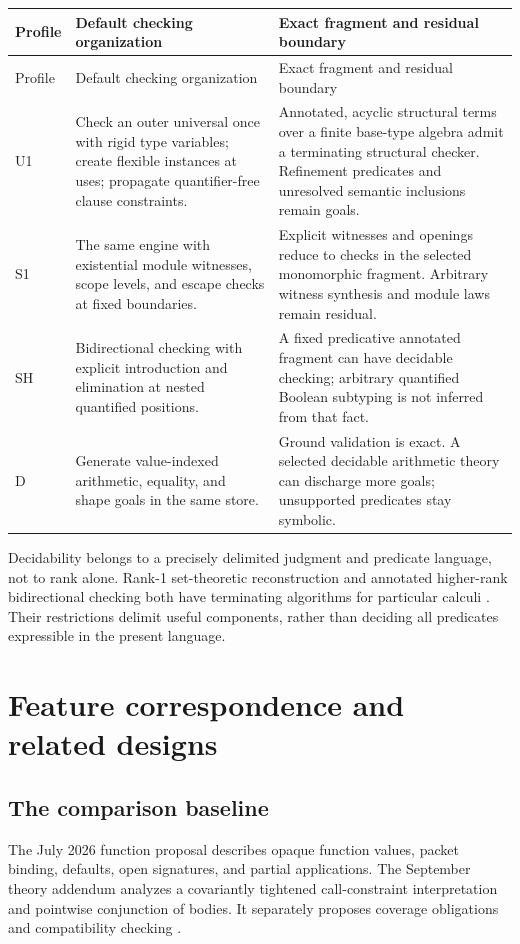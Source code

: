 \documentclass[11pt,a4paper,oneside]{report}
\newcommand{\Uone}{\ensuremath{\profilecal{U}_{1}}}
\newcommand{\Sone}{\ensuremath{\profilecal{S}_{1}}}
\newcommand{\Shigher}{\ensuremath{\profilecal{S}_{H}}}
\newcommand{\Dep}{\ensuremath{\profilecal{D}}}
\def\Uone{U1}%
\def\Sone{S1}%
\def\Shigher{SH}%
\def\Dep{D}%
\theoremstyle{remark}
\begin{document}
\begin{longtable}{@{}P{0.15\textwidth}P{0.39\textwidth}P{0.40\textwidth}@{}}
\toprule
Profile & Default checking organization & Exact fragment and residual boundary\\\midrule
\endfirsthead
\toprule Profile & Default checking organization & Exact fragment and residual boundary\\\midrule
\endhead
\Uone{} & Check an outer universal once with rigid type variables; create
flexible instances at uses; propagate quantifier-free clause constraints. &
Annotated, acyclic structural terms over a finite base-type algebra admit a
terminating structural checker. Refinement predicates and unresolved semantic
inclusions remain goals.\\
\Sone{} & The same engine with existential module witnesses, scope levels, and
escape checks at fixed boundaries. & Explicit witnesses and openings reduce to
checks in the selected monomorphic fragment. Arbitrary witness synthesis and
module laws remain residual.\\
\Shigher{} & Bidirectional checking with explicit introduction and elimination
at nested quantified positions. & A fixed predicative annotated fragment can
have decidable checking; arbitrary quantified Boolean subtyping is not inferred
from that fact.\\
\Dep{} & Generate value-indexed arithmetic, equality, and shape goals in the
same store. & Ground validation is exact. A selected decidable arithmetic theory
can discharge more goals; unsupported predicates stay symbolic.\\\bottomrule
\end{longtable}

Decidability belongs to a precisely delimited judgment and predicate language,
not to rank alone. Rank-1 set-theoretic reconstruction and annotated higher-rank
bidirectional checking both have terminating algorithms for particular calculi
\cite{cln2024,dunfield}. Their restrictions delimit useful components, rather
than deciding all predicates expressible in the present language.



\chapter{Feature correspondence and related designs}
\label{ch:comparison}
\section{The comparison baseline}
The July 2026 function proposal describes opaque function values, packet binding,
defaults, open signatures, and partial applications. The September theory
addendum analyzes a covariantly tightened call-constraint interpretation and
pointwise conjunction of bodies. It separately proposes coverage obligations
and compatibility checking \cite{cueproposal,cueaddendum}.
\end{document}
